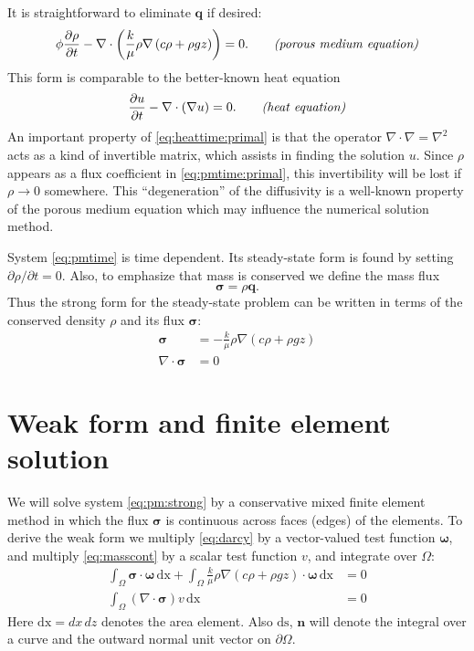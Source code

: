 \documentclass[11pt]{amsart}
\newcommand{\bn}{\mathbf{n}}
\newcommand{\bq}{\mathbf{q}}
\newcommand{\bsigma}{\bm{\sigma}}
\newcommand{\bomega}{\bm{\omega}}
\newcommand{\dx}{\mathrm{dx}}
\newcommand{\ds}{\mathrm{ds}}
\newcommand{\Div}{\nabla\cdot}
\newcommand{\grad}{\nabla}
\begin{document}
It is straightforward to eliminate $\bq$ if desired:
\begin{equation}
\phi \frac{\partial \rho}{\partial t} - \Div \left(\frac{k}{\mu} \rho \grad\left(c \rho + \rho g z\right)\right) = 0.  \qquad \text{\emph{(porous medium equation)}} \label{eq:pmtime:primal}
\end{equation}
This form is comparable to the better-known heat equation
\begin{equation}
\frac{\partial u}{\partial t} - \Div(\grad u) = 0. \qquad \text{\emph{(heat equation)}}\label{eq:heattime:primal}
\end{equation}
An important property of \eqref{eq:heattime:primal} is that the operator $\Div \grad = \grad^2$ acts as a kind of invertible matrix, which assists in finding the solution $u$.  Since $\rho$ appears as a flux coefficient in \eqref{eq:pmtime:primal}, this invertibility will be lost if $\rho\to 0$ somewhere.  This ``degeneration'' of the diffusivity is a well-known property of the porous medium equation which may influence the numerical solution method.

System \eqref{eq:pmtime} is time dependent.  Its steady-state form is found by setting $\partial \rho/\partial t = 0$.  Also, to emphasize that mass is conserved we define the mass flux
	$$\bsigma = \rho \bq.$$
Thus the strong form for the steady-state problem can be written in terms of the conserved density $\rho$ and its flux $\bsigma$:
\begin{subequations}
\label{eq:pm:strong}
\begin{align}
\bsigma &= - \frac{k}{\mu} \rho \grad\left(c \rho + \rho g z\right) \label{eq:darcy} \\
\Div \bsigma &= 0 \label{eq:masscont}
\end{align}
\end{subequations}

\section{Weak form and finite element solution}

We will solve system \eqref{eq:pm:strong} by a conservative mixed finite element method \citep{Boffi2013} in which the flux $\bsigma$ is continuous across faces (edges) of the elements.  To derive the weak form we multiply \eqref{eq:darcy} by a vector-valued test function $\bomega$, and multiply \eqref{eq:masscont} by a scalar test function $v$, and integrate over $\Omega$:
\begin{subequations}
\label{eq:pm:prelim}
\begin{align}
\int_\Omega \bsigma\cdot \bomega\,\dx + \int_\Omega \frac{k}{\mu} \rho \grad\left(c \rho + \rho g z\right) \cdot \bomega\,\dx &= 0 \\
\int_\Omega (\Div \bsigma) v\,\dx &= 0
\end{align}
\end{subequations}
Here $\dx = dx\,dz$ denotes the area element.  Also $\ds$, $\bn$ will denote the integral over a curve and the outward normal unit vector on $\partial\Omega$.
\end{document}
